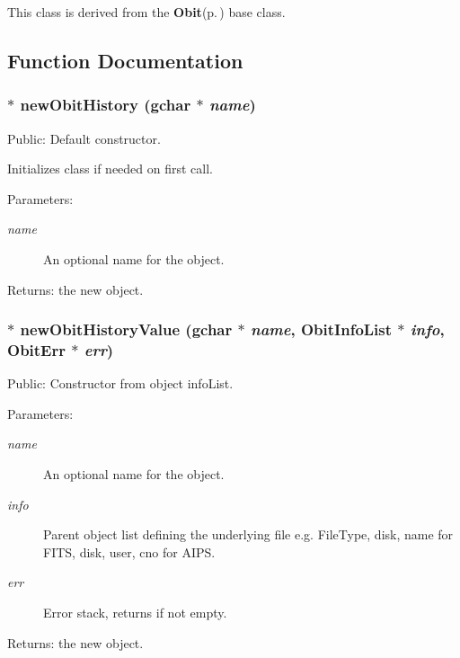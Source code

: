 This class is derived from the {\bf Obit}{\rm (p.\,\pageref{structObit})} base class.

\subsection{Function Documentation}
\subsubsection{$\ast$ new\-Obit\-History (gchar $\ast$ {\em name})}\label{ObitHistory_8c_a7}


Public: Default constructor. 

Initializes class if needed on first call. \begin{Desc}
\item[Parameters:]
\begin{description}
\item[{\em name}]An optional name for the object. \end{description}
\end{Desc}
\begin{Desc}
\item[Returns:]the new object. \end{Desc}
\subsubsection{$\ast$ new\-Obit\-History\-Value (gchar $\ast$ {\em name}, {\bf Obit\-Info\-List} $\ast$ {\em info}, {\bf Obit\-Err} $\ast$ {\em err})}\label{ObitHistory_8c_a8}


Public: Constructor from object info\-List. 

\begin{Desc}
\item[Parameters:]
\begin{description}
\item[{\em name}]An optional name for the object. \item[{\em info}]Parent object list defining the underlying file e.g. File\-Type, disk, name for FITS, disk, user, cno for AIPS. \item[{\em err}]Error stack, returns if not empty. \end{description}
\end{Desc}
\begin{Desc}
\item[Returns:]the new object. \end{Desc}
